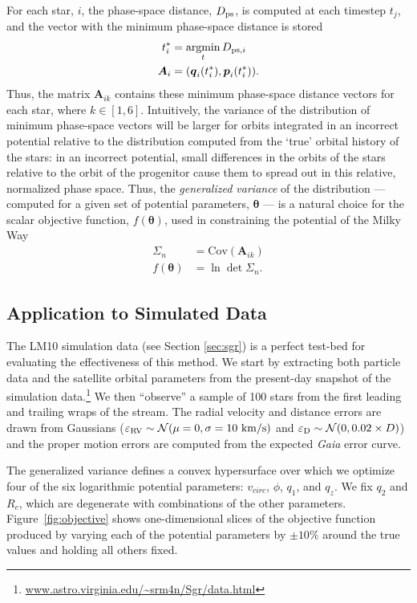 \documentclass{emulateapj}
\newcommand{\bs}{\boldsymbol}
\newcommand{\argmin}{\operatornamewithlimits{argmin}}
\begin{document}
For each star, $i$,
the phase-space distance, $D_{\rm ps}$, is computed at each timestep
$t_{j}$, and the vector with the minimum phase-space distance is stored
\begin{align}
  t^*_{i} &= \argmin_{t} D_{{\rm ps},i}\\
  \bs{A}_{i} &= (\bs{q}_{i}(t^*_{i}),\bs{p}_{i}(t^*_{i})).
\end{align}
Thus, the matrix $\bs{A}_{ik}$ contains these minimum phase-space
distance vectors for each star, where $k\in[1,6]$. Intuitively, the
variance of the distribution of minimum phase-space vectors will be
larger for orbits integrated in an incorrect potential relative to the
distribution computed from the `true' orbital history of the stars: in
an incorrect potential, small differences in the orbits of the stars
relative to the orbit of the progenitor cause them to spread out in
this relative, normalized phase space. Thus, the \emph{generalized
  variance} of the distribution --- computed for a given set of
potential parameters, $\bs{\theta}$ --- is a natural choice for the
scalar objective function, $f(\bs{\theta})$, used in constraining the potential of the
Milky Way
\begin{align}
  \Sigma_n &= \mathrm{Cov}( \bs{A}_{ik}) \\
  f(\bs{\theta}) &= \ln \det \Sigma_n.
\end{align}

\subsection{Application to Simulated Data} \label{sec:results}
The LM10 simulation data (see Section \ref{sec:sgr}) is a perfect
test-bed for evaluating the effectiveness of this method. We start by
extracting both particle data and the satellite orbital parameters
from the present-day snapshot of the simulation
data.\footnote{\url{www.astro.virginia.edu/~srm4n/Sgr/data.html}} We
then ``observe'' a sample of 100 stars from the first leading and
trailing wraps of the stream. The radial velocity and distance errors are drawn 
from Gaussians ($\varepsilon_{\rm RV} \sim \mathcal{N}(\mu=0,\sigma=10~{\rm
  km/s})$ and $\varepsilon_{\rm D} \sim \mathcal{N}(0,0.02\times
D)$) and the proper motion errors are computed from the expected {\it Gaia} error curve. 

The generalized variance defines a convex hypersurface over
which we optimize four of the six logarithmic potential parameters:
$v_{circ}$, $\phi$, $q_1$, and $q_z$. We fix $q_2$ and $R_c$, which
are degenerate with combinations of the other
parameters. Figure~\ref{fig:objective} shows one-dimensional slices of
the objective function produced by varying each of the potential
parameters by $\pm10\%$ around the true values and holding all others
fixed.
\end{document}
